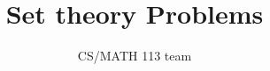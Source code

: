 \documentclass{exam}
\title{Set theory Problems}
\author{CS/MATH 113 team}
\begin{document}
\maketitle

\begin{questions}
    
    
\end{questions}
\end{document}
